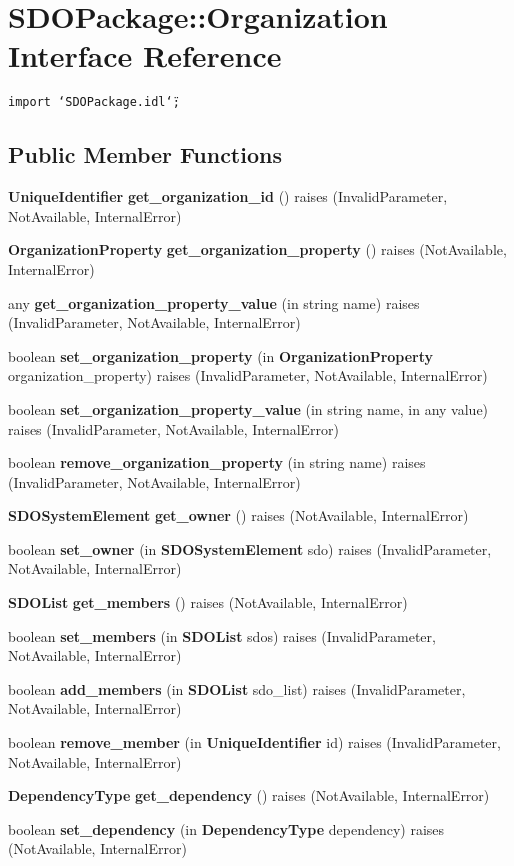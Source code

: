 \section{SDOPackage::Organization Interface Reference}
\label{interfaceSDOPackage_1_1Organization}
{\tt import \char`\"{}SDOPackage.idl\char`\"{};}

\subsection*{Public Member Functions}
\begin{CompactItemize}
\item 
{\bf Unique\-Identifier} {\bf get\_\-organization\_\-id} ()  raises (Invalid\-Parameter, Not\-Available, Internal\-Error)
\item 
{\bf Organization\-Property} {\bf get\_\-organization\_\-property} ()  raises (Not\-Available, Internal\-Error)
\item 
any {\bf get\_\-organization\_\-property\_\-value} (in string name)  raises (Invalid\-Parameter, Not\-Available, Internal\-Error)
\item 
boolean {\bf set\_\-organization\_\-property} (in {\bf Organization\-Property} organization\_\-property)  raises (Invalid\-Parameter, Not\-Available, Internal\-Error)
\item 
boolean {\bf set\_\-organization\_\-property\_\-value} (in string name, in any value)  raises (Invalid\-Parameter, Not\-Available, Internal\-Error)
\item 
boolean {\bf remove\_\-organization\_\-property} (in string name)  raises (Invalid\-Parameter, Not\-Available, Internal\-Error)
\item 
{\bf SDOSystem\-Element} {\bf get\_\-owner} ()  raises (Not\-Available, Internal\-Error)
\item 
boolean {\bf set\_\-owner} (in {\bf SDOSystem\-Element} sdo)  raises (Invalid\-Parameter, Not\-Available, Internal\-Error)
\item 
{\bf SDOList} {\bf get\_\-members} ()  raises (Not\-Available, Internal\-Error)
\item 
boolean {\bf set\_\-members} (in {\bf SDOList} sdos)  raises (Invalid\-Parameter, Not\-Available, Internal\-Error)
\item 
boolean {\bf add\_\-members} (in {\bf SDOList} sdo\_\-list)  raises (Invalid\-Parameter, Not\-Available, Internal\-Error)
\item 
boolean {\bf remove\_\-member} (in {\bf Unique\-Identifier} id)  raises (Invalid\-Parameter, Not\-Available, Internal\-Error)
\item 
{\bf Dependency\-Type} {\bf get\_\-dependency} ()  raises (Not\-Available, Internal\-Error)
\item 
boolean {\bf set\_\-dependency} (in {\bf Dependency\-Type} dependency)  raises (Not\-Available, Internal\-Error)
\end{CompactItemize}


